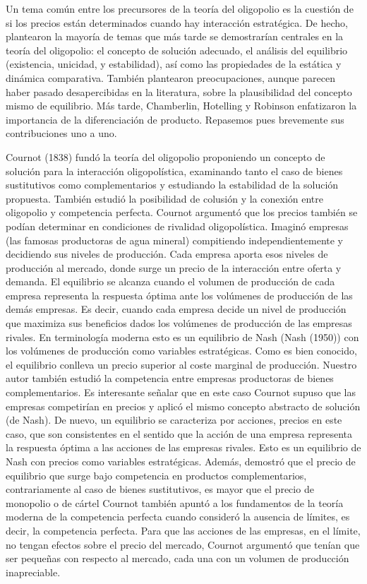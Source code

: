 \documentclass[10pt,a4paper]{article}
\begin{document}
Un tema común entre los precursores de la teoría del oligopolio es la cuestión de si los precios están determinados cuando hay interacción estratégica. De hecho, plantearon la mayoría de temas que más tarde se demostrarían centrales en la teoría del oligopolio: el concepto de solución adecuado, el análisis del equilibrio (existencia, unicidad, y estabilidad), así como las propiedades de la estática y dinámica comparativa. También plantearon preocupaciones, aunque parecen haber pasado desapercibidas en la literatura, sobre la plausibilidad del concepto mismo de equilibrio. Más tarde, Chamberlin, Hotelling y Robinson enfatizaron la importancia de la diferenciación de producto. Repasemos pues brevemente sus contribuciones uno a uno.

Cournot (1838) fundó la teoría del oligopolio proponiendo un concepto de solución para la interacción oligopolística, examinando tanto el caso de bienes sustitutivos como complementarios y estudiando la estabilidad de la solución propuesta. También estudió la posibilidad de colusión y la conexión entre oligopolio y competencia perfecta. Cournot argumentó que los precios también se podían determinar en condiciones de rivalidad oligopolística. Imaginó empresas (las famosas productoras de agua mineral) compitiendo independientemente y decidiendo sus niveles de producción. Cada empresa aporta esos niveles de producción al mercado, donde surge un precio de la interacción entre oferta y demanda. El equilibrio se alcanza cuando el volumen de producción de cada empresa representa la respuesta óptima ante los volúmenes de producción de las demás empresas. Es decir, cuando cada empresa decide un nivel de producción que maximiza sus beneficios dados los volúmenes de producción de las empresas rivales. En terminología moderna esto es un equilibrio de Nash (Nash (1950)) con los volúmenes de producción como variables estratégicas. Como es bien conocido, el equilibrio conlleva un precio superior al coste marginal de producción. Nuestro autor también estudió la competencia entre empresas productoras de bienes complementarios. Es interesante señalar que en este caso Cournot supuso que las empresas competirían en precios y aplicó el mismo concepto abstracto de solución (de Nash). De nuevo, un equilibrio se caracteriza por acciones, precios en este caso, que son consistentes en el sentido que la acción de una empresa representa la respuesta óptima a las acciones de las empresas rivales. Esto es un equilibrio de Nash con precios como variables estratégicas. Además, demostró que el precio de equilibrio que surge bajo competencia en productos complementarios, contrariamente al caso de bienes sustitutivos, es mayor que el precio de monopolio o de cártel Cournot también apuntó a los fundamentos de la teoría moderna de la competencia perfecta cuando consideró la ausencia de límites, es decir, la competencia perfecta. Para que las acciones de las empresas, en el límite, no tengan efectos sobre el precio del mercado, Cournot argumentó que tenían que ser pequeñas con respecto al mercado, cada una con un volumen de producción inapreciable. 
\end{document}
